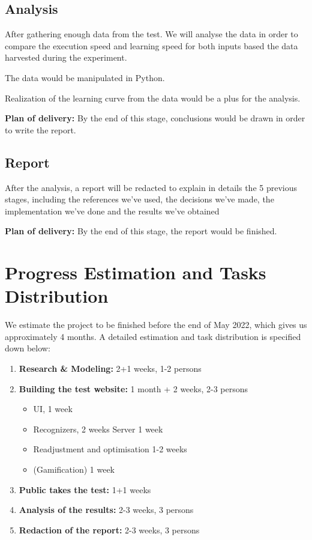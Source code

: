 \documentclass[12pt]{article}
\begin{document}
\subsection{Analysis}
After gathering enough data from the test. We will analyse the data in order to compare the execution speed and learning speed for both inputs based the data harvested during the experiment.

The data would be manipulated in Python.

Realization of the learning curve from the data would be a plus for the analysis.

\textbf{Plan of delivery: }By the end of this stage, conclusions would be drawn in order to write the report.

\subsection{Report}
After the analysis, a report will be redacted to explain in details the 5 previous stages, including the references we've used, the decisions we've made, the implementation we've done and the results we've obtained

\textbf{Plan of delivery: }By the end of this stage, the report would be finished.

\section{Progress Estimation and Tasks Distribution}
We estimate the project to be finished before the end of May 2022, which gives us approximately 4 months. A detailed estimation and task distribution is specified down below:

\begin{enumerate}
    \item \textbf{Research \& Modeling:} 2+1 weeks, 1-2 persons
    \item \textbf{Building the test website:} 1 month + 2 weeks, 2-3 persons
    \begin{itemize}
        \item UI, 1 week
        \item Recognizers, 2 weeks
        \iten Server 1 week
        \item Readjustment and optimisation 1-2 weeks
        \item (Gamification) 1 week
    \end{itemize}
    \item \textbf{Public takes the test:} 1+1 weeks
    \item \textbf{Analysis of the results:} 2-3 weeks, 3 persons 
    \item \textbf{Redaction of the report:} 2-3 weeks, 3 persons
\end{enumerate}
\end{document}
